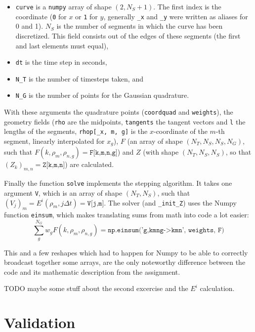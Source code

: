 \documentclass{article}
\begin{document}
\begin{itemize}
    \item \texttt{curve} is a \texttt{numpy} array of shape \((2, N_S+1)\). 
    The first index is the coordinate 
    (\texttt{0} for \(x\) or \texttt{1} for \(y\), generally \texttt{\_x} and \texttt{\_y} were written as aliases for 0 and 1).
    \(N_S\) is the number of segments in which the curve has been discretized. 
    This field consists out of the edges of these segments (the first and last elements must equal),
    \item \texttt{dt} is the time step in seconds,
    \item \texttt{N\_T} is the number of timesteps taken, and
    \item \texttt{N\_G} is the number of points for the Gaussian quadrature.
\end{itemize}

With these arguments the quadrature points (\texttt{coordquad} and \texttt{weights}),
the geometry fields (\texttt{rho} are the midpoints, \texttt{tangents} the tangent vectors and \texttt{l} the lengths of the segments, \texttt{rhop[\_x, m, g]} is the \(x\)-coordinate of the \(m\)-th segment, linearly interpolated for \(x_g\)),
\(F\) (an array of shape \((N_T, N_S, N_S, N_G)\), such that \(F(k,\rho_m,\rho_{n,g}) = \texttt{F[k,m,n,g]}\)) 
and \(Z\) (with shape \((N_T, N_S, N_S)\), so that \((Z_k)_{m,n} = \texttt{Z[k,m,n]}\))
are calculated.

Finally the function \texttt{solve} implements the stepping algorithm.
It takes one argument \texttt{V}, which is an array of shape \((N_T, N_S)\), 
such that \((V_j)_m = E^i(\rho_m, j \Delta t) = \texttt{V[j,m]}\).
The solver (and \texttt{\_init\_Z}) uses the Numpy function \texttt{einsum}, 
which makes translating sums from math into code a lot easier: 
\[ \sum_{g}^{N_G} w_g F(k, \rho_m, \rho_{n,g}) = \texttt{np.einsum('g,kmng->kmn', weights, F)} \]

This and a few reshapes which had to happen for Numpy to be able to correctly broadcast together some arrays,
are the only noteworthy difference between the code and its mathematic description from the assignment.

TODO maybe some stuff about the second excercise and the \(E^i\) calculation.

\section{Validation}
\end{document}
